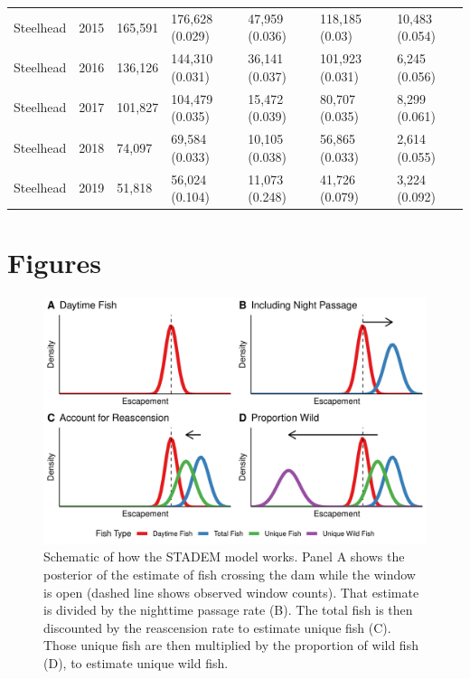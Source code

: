 \documentclass[
  12pt,
]{article}
\begin{document}
\begin{table}
\begin{tabular}[t]{lrlllll}
Steelhead & 2015 & 165,591 & 176,628 (0.029) & 47,959 (0.036) & 118,185 (0.03) & 10,483 (0.054)\\
Steelhead & 2016 & 136,126 & 144,310 (0.031) & 36,141 (0.037) & 101,923 (0.031) & 6,245 (0.056)\\
Steelhead & 2017 & 101,827 & 104,479 (0.035) & 15,472 (0.039) & 80,707 (0.035) & 8,299 (0.061)\\
Steelhead & 2018 & 74,097 & 69,584 (0.033) & 10,105 (0.038) & 56,865 (0.033) & 2,614 (0.055)\\
Steelhead & 2019 & 51,818 & 56,024 (0.104) & 11,073 (0.248) & 41,726 (0.079) & 3,224 (0.092)\\
\bottomrule
\end{tabular}
\end{table}

\newpage

\hypertarget{figures}{%
\section{Figures}\label{figures}}

\begin{figure}
\centering
\includegraphics{../figures/stadem-examp-fig-1.pdf}
\caption{\label{fig:stadem-examp-fig}Schematic of how the STADEM model works. Panel A shows the posterior of the estimate of fish crossing the dam while the window is open (dashed line shows observed window counts). That estimate is divided by the nighttime passage rate (B). The total fish is then discounted by the reascension rate to estimate unique fish (C). Those unique fish are then multiplied by the proportion of wild fish (D), to estimate unique wild fish.}
\end{figure}
\end{document}
